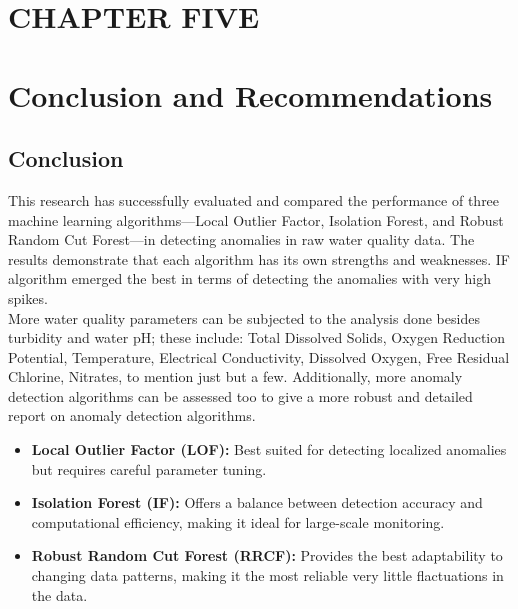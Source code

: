 \documentclass[12pt]{report}
\begin{document}
\section*{\centering CHAPTER FIVE}
\section*{\centering Conclusion and Recommendations}
\setcounter{section}{5} %
\setcounter{subsection}{-1}
\subsection{Conclusion}
This research has successfully evaluated and compared the performance of three machine learning algorithms—Local Outlier Factor, Isolation Forest, and Robust Random Cut Forest—in detecting anomalies in raw water quality data. The results demonstrate that each algorithm has its own strengths and weaknesses. 
IF algorithm  emerged the  best  in terms  of detecting  the  anomalies  with very  high spikes. \\
More water quality parameters can be subjected to the
analysis done besides turbidity and water pH; these include:
Total Dissolved Solids, Oxygen Reduction Potential,
Temperature, Electrical Conductivity, Dissolved Oxygen,
Free Residual Chlorine, Nitrates, to mention just but a few.
Additionally, more anomaly detection algorithms can be
assessed too to give a more robust and detailed report on
anomaly detection algorithms.
\begin{itemize}
    \item \textbf{Local Outlier Factor (LOF):} Best suited for detecting localized anomalies but requires careful parameter tuning.
    \item \textbf{Isolation Forest (IF):} Offers a balance between detection accuracy and computational efficiency, making it ideal for large-scale monitoring.
    \item \textbf{Robust Random Cut Forest (RRCF):} Provides the best adaptability to changing data patterns, making it the most reliable very little  flactuations  in the data.
\end{itemize}
\end{document}
